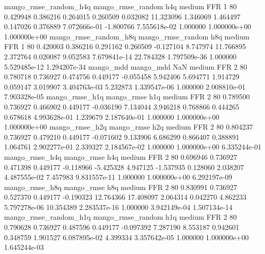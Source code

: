 mango_rmse_random_h4q mango_rmse_random                  h4q     medium      FFR                 1 80  0.429948       0.386216 0.264015       0.260509    0.032082     11.323096      1.346069     1.464497       0.147026  0.376889 7.072666e-01    -1.800766   7.555618e-02            1.000000    1.000000e+00        1.000000e+00
mango_rmse_random_h8q mango_rmse_random                  h8q     medium      FFR                 1 80  0.420003       0.386216 0.291162       0.260509   -0.127104      8.747974     11.766895     2.372764       0.020087  9.052583 7.679841e-14    22.784328   1.797509e-36            1.000000    5.529485e-12        1.294207e-34
            mango_mdd         mango_mdd                  NaN     medium      FFR                 2 80  0.780718       0.736927 0.474756       0.449177   -0.055458      5.942406      5.694771     1.914729       0.059147  3.019907 3.404763e-03     5.232873   1.339547e-06            1.000000    2.008810e-01        7.903328e-05
       mango_rmse_h1q        mango_rmse                  h1q     medium      FFR                 2 80  0.789500       0.736927 0.466902       0.449177   -0.036190      7.134044      3.946218     0.768866       0.444265  0.678618 4.993628e-01     1.239679   2.187640e-01            1.000000    1.000000e+00        1.000000e+00
       mango_rmse_h2q        mango_rmse                  h2q     medium      FFR                 2 80  0.804237       0.736927 0.479210       0.449177   -0.071602      9.133906      6.686299     0.866407       0.388891  1.064761 2.902277e-01     2.339327   2.184567e-02            1.000000    1.000000e+00        6.335244e-01
       mango_rmse_h4q        mango_rmse                  h4q     medium      FFR                 2 80  0.696946       0.736927 0.471398       0.449177   -0.118966     -5.425328      4.947125    -1.537935       0.128060  2.038207 4.487555e-02     7.457983   9.831557e-11            1.000000    1.000000e+00        6.292197e-09
       mango_rmse_h8q        mango_rmse                  h8q     medium      FFR                 2 80  0.830991       0.736927 0.527370       0.449177   -0.190323     12.764366     17.408097     2.064314       0.042270  4.862233 5.797278e-06    10.354389   2.283537e-16            1.000000    3.942149e-04        1.507134e-14
mango_rmse_random_h1q mango_rmse_random                  h1q     medium      FFR                 2 80  0.790628       0.736927 0.487596       0.449177   -0.097392      7.287190      8.553187     0.942601       0.348759  1.901527 6.087895e-02     4.399334   3.357642e-05            1.000000    1.000000e+00        1.645244e-03
